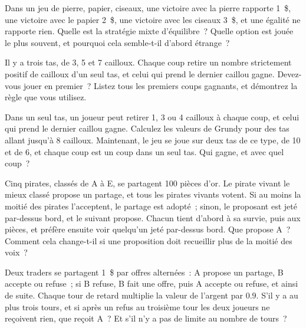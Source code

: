 \begin{question}\label{iq:iv1:games:5}
Dans un jeu de pierre, papier, ciseaux, une victoire avec la pierre rapporte 1~\$, une victoire avec le papier 2~\$, une victoire avec les ciseaux 3~\$, et une égalité ne rapporte rien. Quelle est la stratégie mixte d'équilibre~? Quelle option est jouée le plus souvent, et pourquoi cela semble-t-il d'abord étrange~?
\end{question}

\begin{question}\label{iq:iv1:games:6}
Il y a trois tas, de 3, 5 et 7 cailloux. Chaque coup retire un nombre strictement positif de cailloux d'un seul tas, et celui qui prend le dernier caillou gagne. Devez-vous jouer en premier~? Listez tous les premiers coups gagnants, et démontrez la règle que vous utilisez.
\end{question}

\begin{question}\label{iq:iv1:games:7}
Dans un seul tas, un joueur peut retirer 1, 3 ou 4 cailloux à chaque coup, et celui qui prend le dernier caillou gagne. Calculez les valeurs de Grundy pour des tas allant jusqu'à 8 cailloux. Maintenant, le jeu se joue sur deux tas de ce type, de 10 et de 6, et chaque coup est un coup dans un seul tas. Qui gagne, et avec quel coup~?
\end{question}

\begin{question}\label{iq:iv1:games:8}
Cinq pirates, classés de A à E, se partagent 100 pièces d'or. Le pirate vivant le mieux classé propose un partage, et tous les pirates vivants votent. Si au moins la moitié des pirates l'acceptent, le partage est adopté~; sinon, le proposant est jeté par-dessus bord, et le suivant propose. Chacun tient d'abord à sa survie, puis aux pièces, et préfère ensuite voir quelqu'un jeté par-dessus bord. Que propose A~? Comment cela change-t-il si une proposition doit recueillir plus de la moitié des voix~?
\end{question}

\begin{question}\label{iq:iv1:games:9}
Deux traders se partagent 1~\$ par offres alternées~: A propose un partage, B accepte ou refuse~; si B refuse, B fait une offre, puis A accepte ou refuse, et ainsi de suite. Chaque tour de retard multiplie la valeur de l'argent par $0.9$. S'il y a au plus trois tours, et si après un refus au troisième tour les deux joueurs ne reçoivent rien, que reçoit A~? Et s'il n'y a pas de limite au nombre de tours~?
\end{question}

